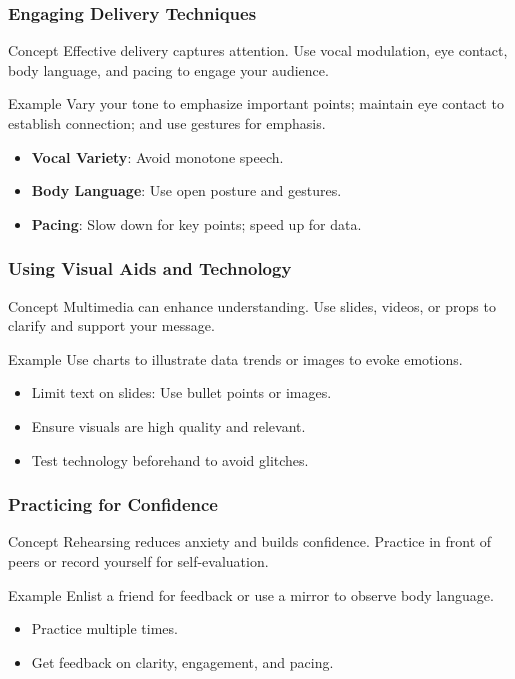 \documentclass[aspectratio=169]{beamer}
\begin{document}
\begin{frame}[fragile]
    \frametitle{Engaging Delivery Techniques}
    \begin{block}{Concept}
        Effective delivery captures attention. Use vocal modulation, eye contact, body language, and pacing to engage your audience.
    \end{block}
    \begin{block}{Example}
        Vary your tone to emphasize important points; maintain eye contact to establish connection; and use gestures for emphasis.
    \end{block}
    \begin{itemize}
        \item \textbf{Vocal Variety}: Avoid monotone speech.
        \item \textbf{Body Language}: Use open posture and gestures.
        \item \textbf{Pacing}: Slow down for key points; speed up for data.
    \end{itemize}
\end{frame}

\begin{frame}[fragile]
    \frametitle{Using Visual Aids and Technology}
    \begin{block}{Concept}
        Multimedia can enhance understanding. Use slides, videos, or props to clarify and support your message.
    \end{block}
    \begin{block}{Example}
        Use charts to illustrate data trends or images to evoke emotions.
    \end{block}
    \begin{itemize}
        \item Limit text on slides: Use bullet points or images.
        \item Ensure visuals are high quality and relevant.
        \item Test technology beforehand to avoid glitches.
    \end{itemize}
\end{frame}

\begin{frame}[fragile]
    \frametitle{Practicing for Confidence}
    \begin{block}{Concept}
        Rehearsing reduces anxiety and builds confidence. Practice in front of peers or record yourself for self-evaluation.
    \end{block}
    \begin{block}{Example}
        Enlist a friend for feedback or use a mirror to observe body language.
    \end{block}
    \begin{itemize}
        \item Practice multiple times.
        \item Get feedback on clarity, engagement, and pacing.
    \end{itemize}
\end{frame}
\end{document}
